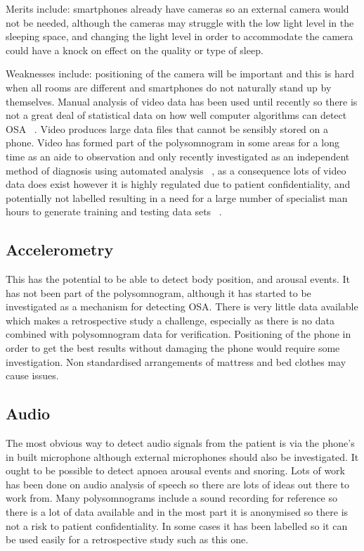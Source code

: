 Merits include: smartphones already have cameras so an external camera would not be needed, although the cameras may struggle with the low light level in the sleeping space, and changing the light level in order to accommodate the camera could have a knock on effect on the quality or type of sleep. 

Weaknesses include: positioning of the camera will be important and this is hard when all rooms are different and smartphones do not naturally stand up by themselves. Manual analysis of video data has been used until recently so there is not a great deal of statistical data on how well computer algorithms can detect OSA ~\cite{roebuck2014review}. Video produces large data files that cannot be sensibly stored on a phone. Video has formed part of the polysomnogram in some areas for a long time as an aide to observation and only recently investigated as an independent method of diagnosis using automated analysis ~\cite{nhschoicesdiagnosis}, as a consequence lots of video data does exist however it is highly regulated due to patient confidentiality, and potentially not labelled resulting in a need for a large number of specialist man hours to generate training and testing data sets ~\cite{confidentialitynhs}.

\subsection{Accelerometry}
This has the potential to be able to detect body position, and arousal events. It has not been part of the polysomnogram, although it has started to be investigated as a mechanism for detecting OSA. There is very little data available which makes a retrospective study a challenge, especially as there is no data combined with polysomnogram data for verification. Positioning of the phone in order to get the best results without damaging the phone would require some investigation. Non standardised arrangements of mattress and bed clothes may cause issues. 

\subsection{Audio}
The most obvious way to detect audio signals from the patient is via the phone’s in built microphone although external microphones should also be investigated. It ought to be possible to detect apnoea arousal events and snoring. Lots of work has been done on audio analysis of speech so there are lots of ideas out there to work from. Many polysomnograms include a sound recording for reference so there is a lot of data available and in the most part it is anonymised so there is not a risk to patient confidentiality. In some cases it has been labelled so it can be used easily for a retrospective study such as this one. 

